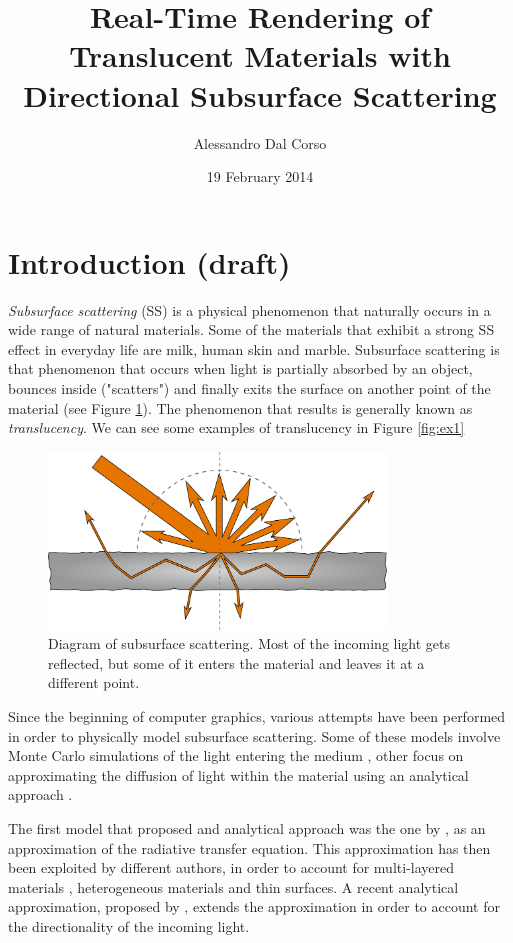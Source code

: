 \documentclass[12pt, twoside,a4paper]{article}
\begin{document}
\title{Real-Time Rendering of Translucent Materials with Directional Subsurface Scattering}
\date{19 February 2014}
\author{Alessandro Dal Corso}
\maketitle
\section{Introduction (draft)}
\emph{Subsurface scattering} (SS) is a physical phenomenon that naturally occurs in a wide range of natural materials. Some of the materials that exhibit a strong SS effect in everyday life are milk, human skin and marble. Subsurface scattering is that phenomenon that occurs when light is partially absorbed by an object, bounces inside ("scatters") and finally exits the surface on another point of the material (see Figure \ref{fig:ssdiagram}). The phenomenon that results is generally known as \emph{translucency}. We can see some examples of translucency in Figure \ref{fig:ex1}

\begin{figure}[here]
\centering
\includegraphics[width=0.8\textwidth]{images/diagram}
\caption{Diagram of subsurface scattering. Most of the incoming light gets reflected, but some of it enters the material and leaves it at a different point.}
\label{fig:ssdiagram}
\end{figure}

Since the beginning of computer graphics, various attempts have been performed in order to physically model subsurface scattering. Some of these models involve Monte Carlo simulations of the light entering the medium \citep{Pharr:2000:MCE:344779.344824}, other focus on approximating the diffusion of light within the material using an analytical approach \citep{Jensen:2001:PMS:383259.383319}.
 
The first model that proposed and analytical approach was the one by \cite{Jensen:2001:PMS:383259.383319}, as an approximation of the radiative transfer equation. This approximation has then been exploited by different authors, in order to account for multi-layered materials \citep{Donner:2005:LDM:1186822.1073308}, heterogeneous materials \citep{journals/cgf/WangWHSYG10} and thin surfaces\citep{journals/cgf/WangWHSYG10}. A recent analytical approximation, proposed by \cite{IMM2013-06646}, extends the approximation in order to account for the directionality of the incoming light. 
\end{document}

